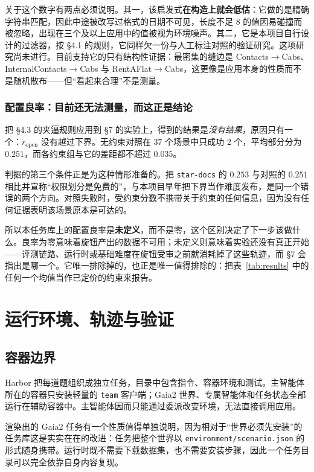 \documentclass[UTF8,11pt,fontset=fandol]{ctexart}
\begin{document}
关于这个数字有两点必须说明。其一，该启发式\textbf{在构造上就会低估}：它做的是精确字符串匹配，因此中途被改写过格式的日期不可见，长度不足 8 的值因易碰撞而被忽略，出现在三个及以上应用中的值被视为环境噪声。其二，它是本项目自行设计的过滤器，按 \S4.1 的规则，它同样欠一份与人工标注对照的验证研究。这项研究尚未进行。目前支持它的只有结构性证据：最密集的缝边是 Contacts$\rightarrow$Cabs、InternalContacts$\rightarrow$Cabs 与 RentAFlat$\rightarrow$Cabs，这更像是应用本身的性质而不是随机散布——但“看起来合理”不是测量。

\subsubsection*{配置良率：目前还无法测量，而这正是结论}

把 \S4.3 的夹逼规则应用到 \S7 的实验上，得到的结果是\emph{没有结果}，原因只有一个：$r_{\mathrm{open}}$ 没有越过下界。无约束对照在 37 个场景中只成功 2 个，平均部分分为 $0.251$，而各约束组与它的差距都不超过 $0.035$。

判据的第三个条件正是为这种情形准备的。把 \texttt{star-docs} 的 $0.253$ 与对照的 $0.251$ 相比并宣称“权限划分是免费的”，与本项目早年把下界当作难度发布，是同一个错误的两个方向。对照失败时，受约束分数不携带关于约束的任何信息，因为没有任何证据表明该场景原本是可达的。

所以本任务库上的配置良率是\textbf{未定义}，而不是零，这个区别决定了下一步该做什么。良率为零意味着旋钮产出的数据不可用；未定义则意味着实验还没有真正开始——评测链路、运行时或基础难度在旋钮受审之前就消耗掉了这些轨迹，而 \S7 会指出是哪一个。它唯一排除掉的，也正是唯一值得排除的：把表~\ref{tab:results} 中的任何一个均值当作已定价的约束来报告。

\section{运行环境、轨迹与验证}

\subsection{容器边界}

Harbor 把每道题组织成独立任务，目录中包含指令、容器环境和测试\cite{harbor2026tasks}。主智能体所在的容器只安装轻量的 \texttt{team} 客户端；Gaia2 世界、专属智能体和任务状态全部运行在辅助容器中。主智能体因而只能通过委派改变环境，无法直接调用应用。

渲染出的 Gaia2 任务有一个性质值得单独说明，因为相对于“世界必须先安装”的任务库这是实实在在的改进：任务把整个世界以 \texttt{environment/scenario.json} 的形式随身携带。运行时既不需要下载数据集，也不需要安装步骤，因此一个任务目录可以完全依靠自身内容复现。
\end{document}
